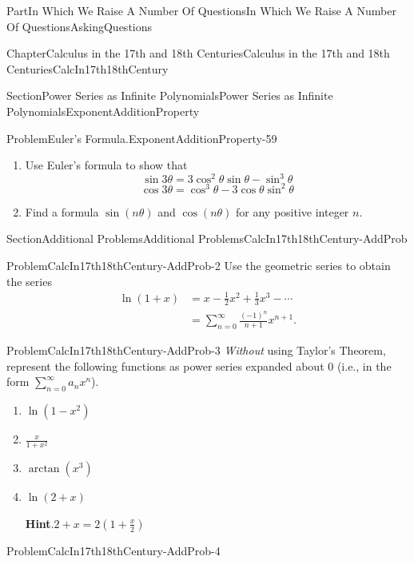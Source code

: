 \documentclass[oneside,10pt,]{book}
\newcommand{\blocktitlefont}{\relax}
\numberwithin{equation}{part}
\newcommand{\amp}{&}
\begin{document}
\begin{partptx}{Part}{In Which We Raise A Number Of Questions}{}{In Which We Raise A Number Of Questions}{}{}{AskingQuestions}
\begin{chapterptx}{Chapter}{Calculus in the 17th and 18th Centuries}{}{Calculus in the 17th and 18th Centuries}{}{}{CalcIn17th18thCentury}
\begin{sectionptx}{Section}{Power Series as Infinite Polynomials}{}{Power Series as Infinite Polynomials}{}{}{ExponentAdditionProperty}
\begin{problem}{Problem}{Euler's Formula.}{ExponentAdditionProperty-59}
\begin{enumerate}[font=\bfseries,label=(\alph*),ref=\alph*]
\begin{equation*}
\cos 2\theta =\cos^2\theta-\sin^2\theta
\end{equation*}
%
\item{}Use Euler's formula to show that%
\begin{equation*}
\sin 3\theta = 3\cos^2\theta\sin\theta-\sin^3\theta
\end{equation*}
%
\begin{equation*}
\cos 3\theta=\cos^3\theta-3\cos\theta\sin^2\theta
\end{equation*}
%
\item{}Find a formula \(\sin(n\theta)\) and \(\cos(n\theta)\) for any positive integer \(n\).%
\end{enumerate}%
\end{problem}
\end{sectionptx}
%
%
\typeout{************************************************}
\typeout{************************************************}
%
\begin{sectionptx}{Section}{Additional Problems}{}{Additional Problems}{}{}{CalcIn17th18thCentury-AddProb}
\begin{problem}{Problem}{}{CalcIn17th18thCentury-AddProb-2}%
Use the geometric series to obtain the series%
\begin{align*}
\ln \left(1+x\right)\amp =x-\frac{1}{2}x^2+\frac{1}{3}x^3-\cdots\\
\amp =\sum_{n=0}^\infty\frac{(-1)^n}{n+1}x^{n+1}.{}
\end{align*}
%
\end{problem}
\begin{problem}{Problem}{}{CalcIn17th18thCentury-AddProb-3}%
\emph{Without} using Taylor's Theorem, represent the following functions as power series expanded about 0 (i.e., in the form \(\sum_{n=0}^\infty a_nx^n\)).%
\begin{enumerate}[font=\bfseries,label=(\alph*),ref=\alph*]%
\item{}\(\ln\left(1-x^2\right)\)%
\item{}\(\frac{x}{1+x^2}\)%
\item{}\(\arctan \left(x^3\right)\)%
\item{}\(\ln\left(2+x\right)\)%
\par\smallskip%
\noindent\textbf{\blocktitlefont Hint}.\hypertarget{CalcIn17th18thCentury-AddProb-3-6-2}{}\quad{}\(2+x=2\left(1+\frac{x}{2}\right)\)%
\end{enumerate}%
\end{problem}
\begin{problem}{Problem}{}{CalcIn17th18thCentury-AddProb-4}%

\end{problem}
\end{sectionptx}
\end{chapterptx}
\end{partptx}
\end{document}
